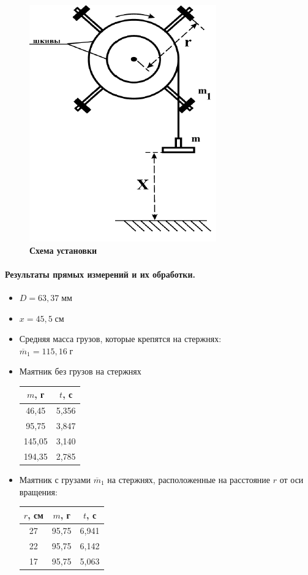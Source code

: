 \documentclass{article}
\begin{document}
\begin{figure}[htb]
	\caption{\bf Схема установки}
	\centering \includegraphics[scale=0.5]{схема}
\end{figure}


\paragraph{Результаты прямых измерений и их обработки.}
\begin{itemize}
	\item $ D=63,37\;\mbox{мм} $
	\item $ x=45,5\;\mbox{см} $
	\item Средняя масса грузов, которые крепятся на стержнях:\\
	$ \overline{m}_1 = 115,16\;\mbox{г}$
	\item Маятник без грузов на стержнях
	
	\begin{tabular}{c|c}
		
		$m$, г& $t$, с \\
		\hline
		46,45& 5,356 \\
		
		95,75& 3,847 \\
		
		145,05& 3,140 \\
		
		194,35& 2,785 \\
	\end{tabular}
\item Маятник с грузами $\overline{m}_1$ на стержнях, расположенные на расстояние $r$ от оси вращения:

\begin{tabular}{c|c|c}

	$r$, см&$m$, г& $t$, с \\
	\hline
	27&95,75  &6,941  \\
	22&95,75  &6,142  \\
	17&95,75  &5,063  \\
	
\end{tabular}


\end{itemize}
\end{document}
